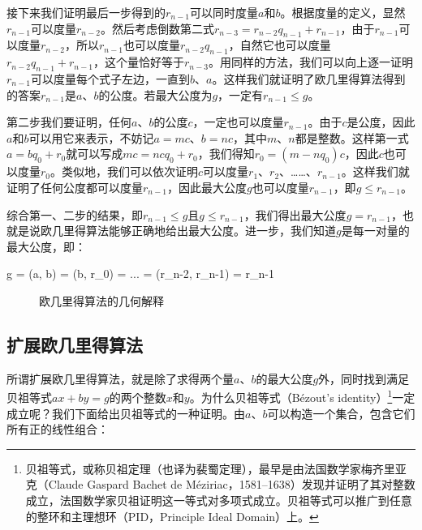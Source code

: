 \documentclass[UTF8]{article}
\begin{document}
接下来我们证明最后一步得到的$r_{n-1}$可以同时度量$a$和$b$。根据度量的定义，显然$r_{n-1}$可以度量$r_{n-2}$。然后考虑倒数第二式$r_{n-3} = r_{n-2} q_{n-1} + r_{n-1}$，由于$r_{n-1}$可以度量$r_{n-2}$，所以$r_{n-1}$也可以度量$r_{n-2} q_{n-1}$，自然它也可以度量$r_{n-2} q_{n-1} + r_{n-1}$，这个量恰好等于$r_{n-3}$。用同样的方法，我们可以向上逐一证明$r_{n-1}$可以度量每个式子左边，一直到$b$、$a$。这样我们就证明了欧几里得算法得到的答案$r_{n-1}$是$a$、$b$的公度。若最大公度为$g$，一定有$r_{n-1} \leq g$。

第二步我们要证明，任何$a$、$b$的公度$c$，一定也可以度量$r_{n-1}$。由于$c$是公度，因此$a$和$b$可以用它来表示，不妨记$a = mc$、$b = nc$，其中$m$、$n$都是整数。这样第一式$a = b q_0 + r_0$就可以写成$mc = ncq_0 + r_0$，我们得知$r_0 = (m - nq_0)c$，因此$c$也可以度量$r_0$。类似地，我们可以依次证明$c$可以度量$r_1$、$r_2$、……、$r_{n-1}$。这样我们就证明了任何公度都可以度量$r_{n-1}$，因此最大公度$g$也可以度量$r_{n-1}$，即$g \leq r_{n-1}$。

综合第一、二步的结果，即$r_{n-1} \leq g$且$g \leq r_{n-1}$，我们得出最大公度$g = r_{n-1}$，也就是说欧几里得算法能够正确地给出最大公度。进一步，我们知道$g$是每一对量的最大公度，即：

\be
g = \gcm(a, b) = \gcm(b, r_0) = ... = \gcm(r_{n-2}, r_{n-1}) = r_{n-1}
\label{eq:recursive-gcm}
\ee

\begin{figure}[htbp]
 \centering
 \captionsetup{labelformat=empty}
 \caption{欧几里得算法的几何解释}
 \label{fig:geometric-GCM}
\end{figure}

\subsection{扩展欧几里得算法}

 
所谓扩展欧几里得算法，就是除了求得两个量$a$、$b$的最大公度$g$外，同时找到满足贝祖等式$ax + by = g$的两个整数$x$和$y$。为什么贝祖等式（Bézout's identity）\footnote{贝祖等式，或称贝祖定理（也译为裴蜀定理），最早是由法国数学家梅齐里亚克（Claude Gaspard Bachet de Méziriac，1581–1638）发现并证明了其对整数成立，法国数学家贝祖证明这一等式对多项式成立。贝祖等式可以推广到任意的整环和主理想环（PID，Principle Ideal Domain）上。}一定成立呢？我们下面给出贝祖等式的一种证明。由$a$、$b$可以构造一个集合，包含它们所有正的线性组合：
\end{document}
